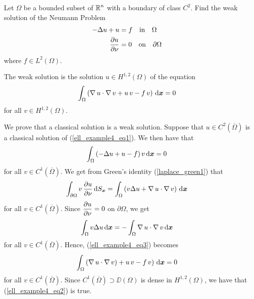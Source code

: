 \begin{egg}
Let $\Omega$ be a bounded subset of $\displaystyle \mathbb{R}^n$ with a
boundary of class $\displaystyle C^2$.
Find the weak solution of the Neumann Problem          \label{eggNewmanBdr}
\begin{equation} \label{ell_example4_eq1}
\begin{split}
-\Delta u + u &= f \quad \text{in} \quad \Omega \\
\frac{\partial{u}}{\partial \nu} &= 0 \quad \text{on} \quad \partial \Omega
\end{split}
\end{equation}
where $\displaystyle f \in L^2(\Omega)$.

The weak solution is the solution $\displaystyle u\in H^{1,2}(\Omega)$ of
the equation
\begin{equation} \label{ell_example4_eq2}
\int_\Omega \left( \operatorname{\nabla} u \cdot \operatorname{\nabla} v
+ u\, v - f\, v \right) \,\mathrm{d}{{\bm{x}}} = 0
\end{equation}
for all $\displaystyle v \in H^{1,2}(\Omega)$.

We prove that a classical solution is a weak solution.  Suppose that
$\displaystyle u \in C^2(\overline{\Omega})$ is a classical solution of
(\ref{ell_example4_eq1}).  We then have that
\begin{equation} \label{ell_example4_eq3}
\int_\Omega \left( -\Delta u + u - f\right)
v \,\mathrm{d}{{\bm{x}}} = 0
\end{equation}
for all $\displaystyle v \in C^1(\overline{\Omega})$.
We get from Green's identity (\ref{laplace_green1}) that
\[
\int_{\partial \Omega} v\,\frac{\partial{u}}{\partial \nu} \,\mathrm{d}{S}_{{\bm{x}}}
= \int_\Omega \left( v \Delta u + \operatorname{\nabla} u \cdot \operatorname{\nabla} v \right)
\,\mathrm{d}{{\bm{x}}}
\]
for all $\displaystyle v \in C^1(\overline{\Omega})$.
Since $\displaystyle \frac{\partial{u}}{\partial \nu} = 0$ on $\partial \Omega$, we
get
\[
\int_\Omega  v \Delta u \,\mathrm{d}{{\bm{x}}} =
- \int_\Omega \operatorname{\nabla} u \cdot \operatorname{\nabla} v \,\mathrm{d}{{\bm{x}}}
\]
for all $\displaystyle v \in C^1(\overline{\Omega})$.
Hence, (\ref{ell_example4_eq3}) becomes
\[
\int_\Omega \left( \operatorname{\nabla} u \cdot \operatorname{\nabla} v) + u\, v
 - f\, v\right) \,\mathrm{d}{{\bm{x}}} = 0
\]
for all $\displaystyle v \in C^1(\overline{\Omega})$.
Since $\displaystyle C^1(\overline{\Omega}) \supset \DD(\Omega)$ is
dense in $\displaystyle H^{1,2}(\Omega)$, we
have that (\ref{ell_example4_eq2}) is true.


\end{egg}
